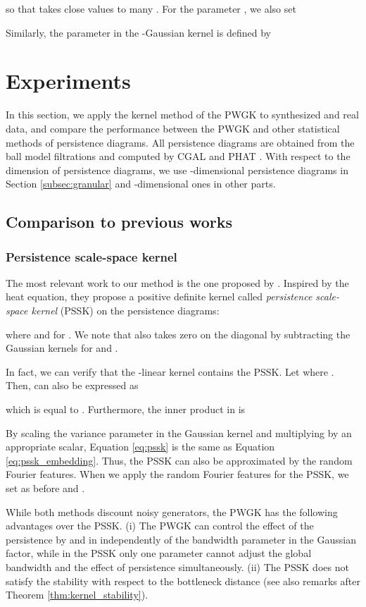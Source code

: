 \documentclass{article}
\begin{document}
so that  takes close values to many .
For the parameter , we also set 

Similarly, the parameter  in the -Gaussian kernel is defined by 




\section{Experiments}
\label{sec:experiment}

In this section, we apply the kernel method of the PWGK to synthesized and real data, and compare the performance between the PWGK and other statistical methods of persistence diagrams. 
All persistence diagrams are obtained from the ball model filtrations and computed by CGAL \cite{DLY15} and PHAT \cite{BKRW14}. 
With respect to the dimension of persistence diagrams, we use -dimensional persistence diagrams in Section \ref{subsec:granular} and -dimensional ones in other parts.

\subsection{Comparison to previous works}
\label{subsec:comparison}

\subsubsection{Persistence scale-space kernel}
\label{subsubsec:pssk}
The most relevant work to our method is the one proposed by \cite{RHBK15}.
Inspired by the heat equation, they propose a positive definite kernel called {\em persistence scale-space kernel} (PSSK)  on the persistence diagrams:

where  and  for .
We note that  also takes zero on the diagonal by subtracting the Gaussian kernels for  and .  

In fact, we can verify that the -linear kernel contains the PSSK.
Let  where .
Then,  can also be expressed as 

which is equal to .
Furthermore, the inner product in  is

By scaling the variance parameter  in the Gaussian kernel  and multiplying by an appropriate scalar, Equation \eqref{eq:pssk} is the same as Equation \eqref{eq:pssk_embedding}.
Thus, the PSSK can also be approximated by the random Fourier features. When we apply the random Fourier features for the PSSK, we set  as before and .

While both methods discount noisy generators, the PWGK has the following advantages over the PSSK.
(i) The PWGK can control the effect of the persistence by  and  in  independently of the bandwidth parameter  in the Gaussian factor, while in the PSSK only one parameter  cannot adjust the global bandwidth and the effect of persistence simultaneously.
(ii) The PSSK does not satisfy the stability with respect to the bottleneck distance (see also remarks after Theorem \ref{thm:kernel_stability}).
\end{document}
